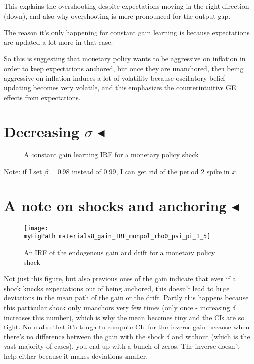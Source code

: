 \documentclass[11pt]{article}
\def \myFigPath {../figures/}
\renewcommand{\[}{\begin{equation}}
\renewcommand{\]}{\end{equation}}
\def\myMediumFigScale{0.25}
\def\mySmallFigScale{0.22}
\begin{document}
This explains the overshooting despite expectations moving in the right direction (down), and also why overshooting is more pronounced for the output gap. 

The reason it's only happening for constant gain learning is because expectations are updated a lot more in that case.

So this is suggesting that monetary policy wants to be aggressive on inflation in order to keep expectations anchored, but once they are unanchored, then being aggressive on inflation induces a lot of volatility because oscillatory belief updating becomes very volatile, and this emphasizes the counterintuitive GE effects from expectations. 

\newpage
\section{Decreasing $\sigma$ $\blacktriangleleft$} 
\begin{figure}[h!]
\caption{A constant gain learning IRF for a monetary policy shock}
\label{gain_irf}
\end{figure}

Note: if I set $\beta = 0.98$ instead of 0.99, I can get rid of the period 2 spike in $x$. 

\newpage
\section{A note on shocks and anchoring $\blacktriangleleft$} 
\begin{figure}[h!]
\texttt{[image: \\myFigPath materials8\_gain\_IRF\_monpol\_rho0\_psi\_pi\_1\_5]}
\caption{An IRF of the endogenous gain and drift for a monetary policy shock}
\end{figure}

Not just this figure, but also previous ones of the gain indicate that even if a shock knocks expectations out of being anchored, this doesn't lead to huge deviations in the mean path of the gain or the drift. Partly this happens because this particular shock only unanchors very few times (only once - increasing $\delta$ increases this number), which is why the mean becomes tiny and the CIs are so tight. Note also that it's tough to compute CIs for the inverse gain because when there's no difference between the gain with the shock $\delta$ and without (which is the vast majority of cases), you end up with a bunch of zeros. The inverse doesn't help either because it makes deviations smaller.
\end{document}
